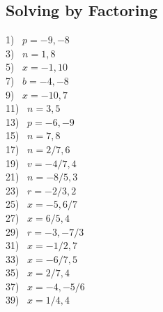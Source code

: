 \documentclass[11pt]{book}
\newcommand{\tmstrong}[1]{\textbf{#1}}
\theoremstyle{definition}  %
\newcommand{\pp}{\par~\par}
\begin{document}

\subsection*{Solving by Factoring}




\begin{multicols}{2}
  1)~ $p=-9,-8$\\
  3)~ $n=1,8$\\
  5)~ $x=-1,10$\\
  7)~ $b=-4,-8$\\
  9)~ $x=-10,7$\\
  11)~ $n=3,5$\\
  13)~ $p=-6,-9$\\
  15)~ $n=7,8$\\
17)~ $n=2/7,6$\\
19)~ $v=-4/7,4$\\
21)~ $n=-8/5,3$\\
23)~ $r=-2/3,2$\\
25)~ $x=-5,6/7$\\
27)~ $x=6/5,4$\\
29)~ $r=-3,-7/3$\\
  31)~ $x=-1/2,7$\\
  33)~ $x=-6/7,5$\\
  35)~ $x=2/7,4$\\
  37)~ $x=-4,-5/6$\\
  39)~ $x=1/4,4$%
\end{multicols}
\end{document}
